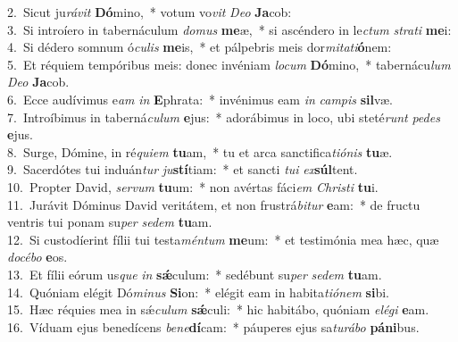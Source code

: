 {2.~}Sicut ju\textit{rá}\textit{vit} \textbf{Dó}mino,~* votum vo\textit{vit} \textit{De}\textit{o} \textbf{Ja}cob:\\
{3.~}Si introíero in tabernáculum \textit{do}\textit{mus} \textbf{me}æ,~* si ascéndero in le\textit{ctum} \textit{stra}\textit{ti} \textbf{me}i:\\
{4.~}Si dédero somnum ó\textit{cu}\textit{lis} \textbf{me}is,~* et pálpebris meis dor\textit{mi}\textit{ta}\textit{ti}\textbf{ó}nem:\\
{5.~}Et réquiem tempóribus meis: donec invéniam \textit{lo}\textit{cum} \textbf{Dó}mino,~* tabernácu\textit{lum} \textit{De}\textit{o} \textbf{Ja}cob.\\
{6.~}Ecce audívimus e\textit{am} \textit{in} \textbf{E}phrata:~* invénimus eam \textit{in} \textit{cam}\textit{pis} \textbf{sil}væ.\\
{7.~}Introíbimus in taberná\textit{cu}\textit{lum} \textbf{e}jus:~* adorábimus in loco, ubi steté\textit{runt} \textit{pe}\textit{des} \textbf{e}jus.\\
{8.~}Surge, Dómine, in ré\textit{qui}\textit{em} \textbf{tu}am,~* tu et arca sanctifica\textit{ti}\textit{ó}\textit{nis} \textbf{tu}æ.\\
{9.~}Sacerdótes tui induán\textit{tur} \textit{ju}\textbf{stí}tiam:~* et sancti \textit{tu}\textit{i} \textit{ex}\textbf{súl}tent.\\
{10.~}Propter David, \textit{ser}\textit{vum} \textbf{tu}um:~* non avértas fáci\textit{em} \textit{Chri}\textit{sti} \textbf{tu}i.\\
{11.~}Jurávit Dóminus David veritátem, et non frustrá\textit{bi}\textit{tur} \textbf{e}am:~* de fructu ventris tui ponam su\textit{per} \textit{se}\textit{dem} \textbf{tu}am.\\
{12.~}Si custodíerint fílii tui testa\textit{mén}\textit{tum} \textbf{me}um:~* et testimónia mea hæc, quæ \textit{do}\textit{cé}\textit{bo} \textbf{e}os.\\
{13.~}Et fílii eórum us\textit{que} \textit{in} \textbf{sǽ}culum:~* sedébunt su\textit{per} \textit{se}\textit{dem} \textbf{tu}am.\\
{14.~}Quóniam elégit Dó\textit{mi}\textit{nus} \textbf{Si}on:~* elégit eam in habita\textit{ti}\textit{ó}\textit{nem} \textbf{si}bi.\\
{15.~}Hæc réquies mea in sǽ\textit{cu}\textit{lum} \textbf{sǽ}culi:~* hic habitábo, quóniam \textit{e}\textit{lé}\textit{gi} \textbf{e}am.\\
{16.~}Víduam ejus benedícens \textit{be}\textit{ne}\textbf{dí}cam:~* páuperes ejus sa\textit{tu}\textit{rá}\textit{bo} \textbf{pá}\textbf{ni}bus.\\
